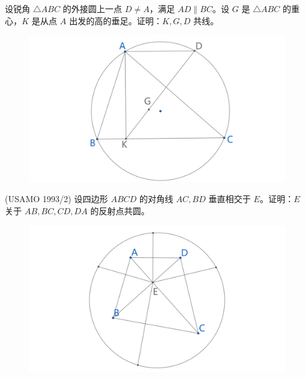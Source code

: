 

\newpage 
\begin{exercise}
    设锐角 $\triangle ABC$ 的外接圆上一点 $D \neq A$，满足 $AD \parallel {BC}$。设 $G$ 是 $\triangle ABC$ 的重心，$K$ 是从点 $A$ 出发的高的垂足。证明：$K, G, D$ 共线。
\end{exercise}
\begin{figure}[H]
    \centering
    \includegraphics[width=0.7\linewidth]{figures/exercises/324.png}
\end{figure}

\begin{exercise}
    (USAMO 1993/2) 设四边形 $ABCD$ 的对角线 ${AC}, {BD}$ 垂直相交于 $E$。证明：$E$ 关于 ${AB}, {BC}, {CD}, {DA}$ 的反射点共圆。
\end{exercise}
\begin{figure}[H]
    \centering
    \includegraphics[width=0.7\linewidth]{figures/exercises/325.png}
\end{figure}



